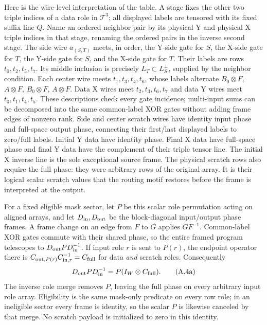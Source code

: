 Here is the wire-level interpretation of the table. A stage fixes the
other two triple indices of a data role in $\mathcal T^3$; all displayed
labels are tensored with its fixed suffix line $Q$. Name an ordered
neighbor pair by its physical Y and physical X triple indices in
that stage, renaming the ordered pairs in the inverse second stage.
The side wire
$a_{(S,T)}$ meets, in order, the Y-side gate for $S$, the X-side
gate for $T$, the Y-side gate for $S$, and the X-side gate for $T$.
Their labels are rows $t_0,t_2,t_5,t_7$. Its middle inclusion is
precisely $L_T\subset L_S^\perp$, supplied by the neighbor condition.
Each center wire meets $t_1,t_3,t_4,t_6$, whose labels alternate
$B_0\otimes F$, $A\otimes F$, $B_0\otimes F$, $A\otimes F$.
Data X wires meet $t_2,t_3,t_6,t_7$ and data Y wires meet
$t_0,t_1,t_4,t_5$. These descriptions check every gate incidence;
multi-input sums can be decomposed into the same common-label XOR
gates without adding frame edges of nonzero rank.
Side and center scratch wires have identity input phase and full-space
output phase, connecting their first/last displayed labels to zero/full
labels. Initial Y data have identity phase. Final X data have full-space
phase and final Y data have the complement of their triple tensor line.
The initial X inverse line is the sole exceptional source frame.
The physical scratch rows also require the full phase: they were
arbitrary rows of the original array. It is their logical scalar
scratch values that the routing motif restores before the frame is
interpreted at the output.

For a fixed eligible mask sector, let $P$ be this scalar role permutation
acting on aligned arrays, and let $D_{\rm in},D_{\rm out}$ be the
block-diagonal input/output phase frames. A frame change on an edge
from $F$ to $G$ applies $GF^{-1}$. Common-label XOR gates commute with
their shared phase, so the entire framed program telescopes to
$D_{\rm out}P D_{\rm in}^{-1}$. If input role $r$ is sent to $P(r)$,
the endpoint operator there is
$C_{{\rm out},P(r)}C_{{\rm in},r}^{-1}=C_{\rm full}$ for data
\emph{and} scratch roles. Consequently
\[
 D_{\rm out}P D_{\rm in}^{-1}
     =P(I_W\otimes C_{\rm full}).                       \tag{A.4a}
 \label{eq:full-role-phase}
\]
The inverse role merge removes $P$, leaving the full phase on every
arbitrary input role array. Eligibility is the same mask-only predicate
on every row role; in an ineligible sector every frame is identity,
so the scalar $P$ is likewise canceled by that merge. No scratch
payload is initialized to zero in this identity.

